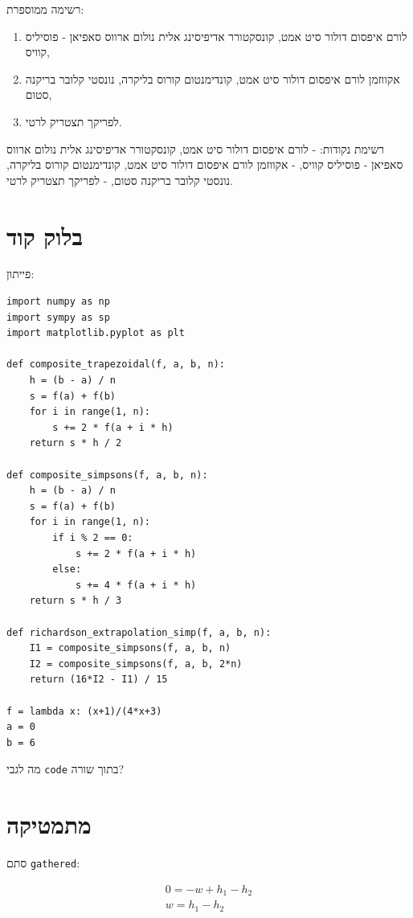 \documentclass[
  a4paper,
]{article}
\providecommand{\tightlist}{%
  \setlength{\itemsep}{0pt}\setlength{\parskip}{0pt}}
\begin{document}
רשימה ממוספרת:

\begin{enumerate}
\def\labelenumi{\arabic{enumi}.}
\tightlist
\item
  לורם איפסום דולור סיט אמט, קונסקטורר אדיפיסינג אלית נולום ארווס סאפיאן
  - פוסיליס קוויס,
\item
  אקווזמן לורם איפסום דולור סיט אמט, קונדימנטום קורוס בליקרה, נונסטי
  קלובר בריקנה סטום,
\item
  לפריקך תצטריק לרטי.
\end{enumerate}

רשימת נקודות: - לורם איפסום דולור סיט אמט, קונסקטורר אדיפיסינג אלית
נולום ארווס סאפיאן - פוסיליס קוויס, - אקווזמן לורם איפסום דולור סיט אמט,
קונדימנטום קורוס בליקרה, נונסטי קלובר בריקנה סטום, - לפריקך תצטריק לרטי.

\section{בלוק קוד}\label{ux5d1ux5dcux5d5ux5e7-ux5e7ux5d5ux5d3}

פייתון:

\begin{verbatim}
import numpy as np
import sympy as sp
import matplotlib.pyplot as plt

def composite_trapezoidal(f, a, b, n):
    h = (b - a) / n
    s = f(a) + f(b)
    for i in range(1, n):
        s += 2 * f(a + i * h)
    return s * h / 2

def composite_simpsons(f, a, b, n):
    h = (b - a) / n
    s = f(a) + f(b)
    for i in range(1, n):
        if i % 2 == 0:
            s += 2 * f(a + i * h)
        else:
            s += 4 * f(a + i * h)
    return s * h / 3

def richardson_extrapolation_simp(f, a, b, n):
    I1 = composite_simpsons(f, a, b, n)
    I2 = composite_simpsons(f, a, b, 2*n)
    return (16*I2 - I1) / 15

f = lambda x: (x+1)/(4*x+3)
a = 0
b = 6
\end{verbatim}

מה לגבי \texttt{code} בתוך שורה?

\section{מתמטיקה}\label{ux5deux5eaux5deux5d8ux5d9ux5e7ux5d4}

סתם \texttt{gathered}:

\[\begin{gathered}
0=-w+{h}_{1}-{h}_{2} \\
w={h}_{1}-{h}_{2}
\end{gathered}\]
\end{document}
